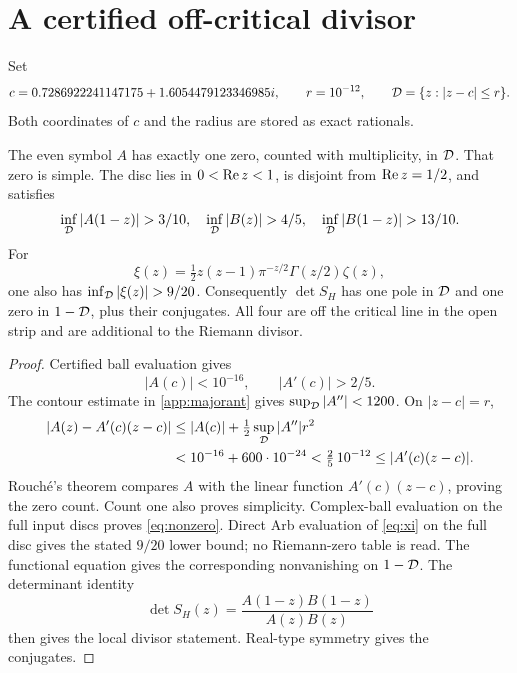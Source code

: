 \section{A certified off-critical divisor}

Set
\begin{equation}\label{eq:disc}
c=0.7286922241147175+1.6054479123346985i,
\qquad r=10^{-12},
\qquad \mathcal{D}=\{z:|z-c|\le r\}.
\end{equation}
Both coordinates of $c$ and the radius are stored as exact rationals.

\begin{theorem}\label{thm:obstruction}
The even symbol $A$ has exactly one zero, counted with multiplicity, in
$\mathcal{D}$. That zero is simple. The disc lies in
$0<\operatorname{Re} z<1$, is disjoint from $\operatorname{Re} z=1/2$, and satisfies
\begin{equation}\label{eq:nonzero}
\inf_{\Disc}|A(1-z)|>3/10,
\quad \inf_{\Disc}|B(z)|>4/5,
\quad \inf_{\Disc}|B(1-z)|>13/10.
\end{equation}
For
\begin{equation}\label{eq:xi}
\xi(z)=\tfrac12z(z-1)\pi^{-z/2}\Gamma(z/2)\zeta(z),
\end{equation}
one also has \(\inf_{\Disc}|\xi(z)|>9/20\).
Consequently $\det S_H$ has one pole in $\mathcal{D}$ and one zero in
$1-\mathcal{D}$, plus their conjugates. All four are off the critical line in the
open strip and are additional to the Riemann divisor.
\end{theorem}

\begin{proof}
Certified ball evaluation gives
\begin{equation}\label{eq:center-bounds}
|A(c)|<10^{-16},\qquad |A'(c)|>2/5.
\end{equation}
The contour estimate in \cref{app:majorant} gives
$\sup_{\mathcal{D}}|A''|<1200$. On $|z-c|=r$,
\begin{align*}
|A(z)-A'(c)(z-c)|
&\le |A(c)|+\tfrac12\sup_{\mathcal{D}}|A''|r^2\\
&<10^{-16}+600\cdot10^{-24}
<\tfrac25\,10^{-12}
\le |A'(c)(z-c)|.
\end{align*}
Rouch\'e's theorem compares $A$ with the linear function
$A'(c)(z-c)$, proving the zero count. Count one also proves simplicity.
Complex-ball evaluation on the full input discs proves
\eqref{eq:nonzero}. Direct Arb evaluation of \eqref{eq:xi} on the full disc
gives the stated \(9/20\) lower bound; no Riemann-zero table is read. The
functional equation gives the corresponding nonvanishing on \(1-\mathcal{D}\).
The determinant identity
\begin{equation}\label{eq:detS}
\det S_H(z)=\frac{A(1-z)B(1-z)}{A(z)B(z)}
\end{equation}
then gives the local divisor statement. Real-type symmetry gives the
conjugates.
\end{proof}

